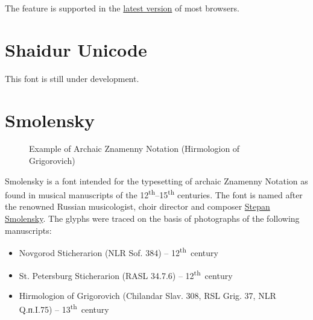 \documentclass[11pt]{article}
\let\cuKrukFont=\musicFont
\begin{document}
The feature is supported in the 
\href{https://caniuse.com/#search=font-feature-settings}{latest version} of most browsers.

\section{Shaidur Unicode}

This font is still under development.

\section{Smolensky}

\begin{figure}[tb]
\centering
\begin{minipage}{0.75\textwidth}
\begin{churchslavonic}
\archaic
\noindent
\let\cuKrukFont=\smol
{}
\end{churchslavonic}
\end{minipage}
\caption{Example of Archaic Znamenny Notation (Hirmologion of Grigorovich) \label{smolensky}}
\end{figure}

Smolensky is a font intended for the typesetting of archaic Znamenny Notation
as found in musical manuscripts of the 12\textsuperscript{th}--15\textsuperscript{th}
centuries. The font is named after the renowned Russian musicologist,
choir director and composer
\href{https://en.wikipedia.org/wiki/Stepan_Smolensky}{Stepan Smolensky}.
The glyphs were traced on the basis of photographs of the following manuscripts:

\begin{itemize}
\item Novgorod Sticherarion (NLR Sof. 384) -- 12\textsuperscript{th}~century
\item St. Petersburg Sticherarion (RASL 34.7.6) -- 12\textsuperscript{th}~century
\item Hirmologion of Grigorovich (Chilandar Slav. 308, RSL Grig. 37, NLR Q.п.I.75) -- 13\textsuperscript{th}~century
\end{itemize}
\end{document}
